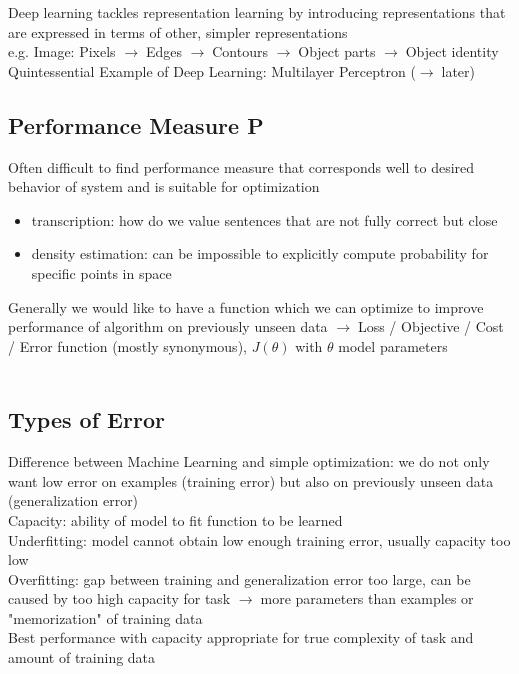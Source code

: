 \documentclass{article}
\newcommand{\arrow}{$\rightarrow\;$}
\begin{document}
Deep learning tackles representation learning by introducing representations that are expressed in terms of other, simpler representations \\
e.g. Image: Pixels \arrow Edges \arrow Contours \arrow Object parts \arrow Object identity \\
Quintessential Example of Deep Learning: Multilayer Perceptron (\arrow later)

\subsection{Performance Measure P}
Often difficult to find performance measure that corresponds well to desired behavior of 
system and is suitable for optimization
\begin{itemize}
    \item transcription: how do we value sentences that are not fully correct but close
    \item density estimation: can be impossible to explicitly compute probability for specific points in space
\end{itemize}

Generally we would like to have a function which we can optimize to improve
performance of algorithm on previously unseen data \arrow Loss / Objective / Cost / Error function (mostly synonymous), $J(\theta)$
with $\theta$ model parameters\\
\\

\subsection{Types of Error}
Difference between Machine Learning and simple optimization: we do not only want low error on examples (training error) but also on 
previously unseen data (generalization error) \\
Capacity: ability of model to fit function to be learned \\
Underfitting: model cannot obtain low enough training error, usually capacity too low \\
Overfitting: gap between training and generalization error too large, can be caused by too high capacity for task
\arrow more parameters than examples or "memorization" of training data \\
Best performance with capacity appropriate for true complexity of task and amount of training data \\
\end{document}
